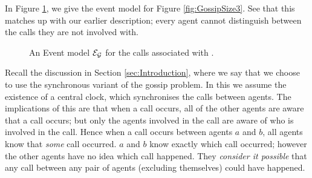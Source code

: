 \documentclass[ %
                    author={Leo Poulson},
                supervisor={Dr. Steven Ramsay},
                    degree={BSc},
                     title={Epistemic Planning for the Dynamic Gossip problem},
                  subtitle={},
                      year={2019} ]{dissertation}
\begin{document}
In Figure \ref{fig:GossipEvMo}, we give the event model for Figure
\ref{fig:GossipSize3}. See that this matches up with our earlier description;
every agent cannot distinguish between the calls they are not involved with.

\begin{figure}[h]
  \centering
  \caption{An Event model $\mathcal{E_G}$ for the calls associated with .}
  \label{fig:GossipEvMo}
\end{figure}


Recall the discussion in Section \ref{sec:Introduction}, where we say that we
choose to use the synchronous variant of the gossip problem. In this we assume
the existence of a central clock, which synchronises the calls between agents.
The implications of this are that when a call occurs, all of the other agents
are aware that a call occurs; but only the agents involved in the call are aware
of who is involved in the call. Hence when a call occurs between agents $a$ and
$b$, all agents know that \emph{some} call occurred. $a$ and $b$ know exactly
which call occurred; however the other agents have no idea which call happened.
They \emph{consider it possible} that any call between any pair of agents
(excluding themselves) could have happened.
\end{document}
